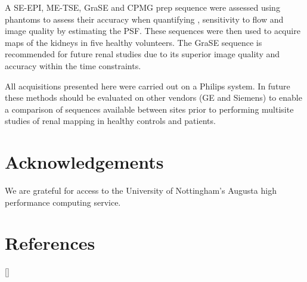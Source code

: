 A \ac{SE}-\ac{EPI}, \ac{ME-TSE}, \ac{GraSE} and \ac{CPMG} \ttwo prep sequence were assessed using phantoms to assess their accuracy when quantifying \ttwo, sensitivity to flow and image quality by estimating the \ac{PSF}. These sequences were then used to acquire \ttwo maps of the kidneys in five healthy volunteers. The \ac{GraSE} sequence is recommended for future renal studies due to its superior image quality and accuracy within the time constraints.

All acquisitions presented here were carried out on a Philips system. In future these methods should be evaluated on other vendors (GE and Siemens) to enable a comparison of sequences available between sites prior to performing multisite studies of renal \ttwo mapping in healthy controls and patients.

\section{Acknowledgements}

We are grateful for access to the University of Nottingham's Augusta high performance computing service.

\newpage
\section{References}
[\refname]{}
\printbibliography